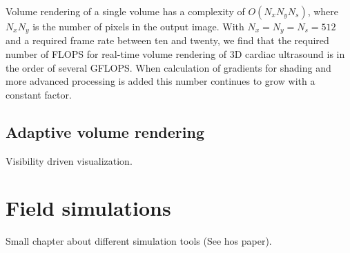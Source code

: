 Volume rendering of a single volume has a complexity of $O(N_xN_yN_s)$, where $N_xN_y$ is the number of pixels in the output image. With $N_x = N_y = N_s = 512$ and a required frame rate between ten and twenty, we find that the required number of FLOPS for real-time volume rendering of 3D cardiac ultrasound is in the order of several GFLOPS. When calculation of gradients for shading and more advanced processing is added this number continues to grow with a constant factor.

\subsection{Adaptive volume rendering}

Visibility driven visualization.

\section{Field simulations}\label{sec:field}

Small chapter about different simulation tools (See hos paper).
			
\endinput
